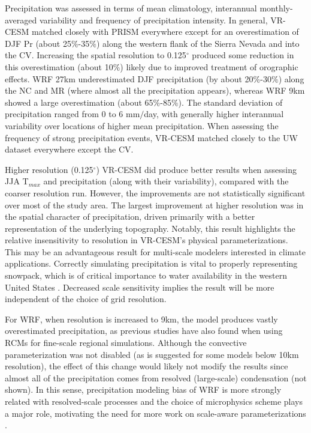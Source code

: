 \documentclass[draft,ms]{agutex}   %
\begin{document}
\begin{article}
Precipitation was assessed in terms of mean climatology, interannual monthly-averaged variability and frequency of precipitation intensity.  In general, VR-CESM matched closely with PRISM everywhere except for an  overestimation of DJF Pr (about 25$\%$-35$\%$) along the western flank of the Sierra Nevada and into the CV. Increasing the spatial resolution to 0.125$^\circ$ produced some reduction in this overestimation (about 10$\%$) likely due to improved treatment of orographic effects. WRF 27km underestimated DJF precipitation (by about 20$\%$-30$\%$) along the NC and MR (where almost all the precipitation appears), whereas WRF 9km showed a large overestimation (about 65$\%$-85$\%$). The standard deviation of precipitation ranged from 0 to 6 mm$/$day, with generally higher interannual variability over locations of higher mean precipitation. When assessing the frequency of strong precipitation events, VR-CESM matched closely to the UW dataset everywhere except the CV.


Higher resolution (0.125$^\circ$) VR-CESM did produce better results when assessing JJA T$_{max}$ and precipitation (along with their variability), compared with the coarser resolution run. However, the improvements are not statistically significant over most of the study area.  The largest improvement at higher resolution was in the spatial character of precipitation, driven primarily with a better representation of the underlying topography. Notably, this result highlights the relative insensitivity to resolution in VR-CESM's physical parameterizations. This may be an advantageous result for multi-scale modelers interested in climate applications. Correctly simulating precipitation is vital to properly representing snowpack, which is of critical importance to water availability in the western United States \citep{bales2006mountain, wise2012hydroclimatology, Rhoades2015Characterizing}. Decreased scale sensitivity implies the result will be more independent of the choice of grid resolution. 

For WRF, when resolution is increased to 9km, the model produces vastly overestimated precipitation, as previous studies have also found when using RCMs for fine-scale regional simulations. Although the convective parameterization was not disabled (as is suggested for some models below 10km resolution), the effect of this change would likely not modify the results since almost all of the precipitation comes from resolved (large-scale) condensation (not shown). In this sense, precipitation modeling bias of WRF is more strongly related with resolved-scale processes and the choice of microphysics scheme plays a major role, motivating the need for more work on scale-aware parameterizations \citep{o2013observed}. 


\end{article}
\end{document}
